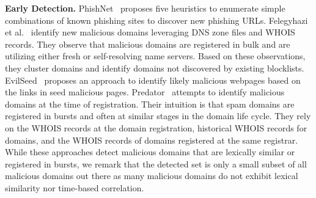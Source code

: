 {\bf Early Detection.} PhishNet~\cite{phishnet:2010} proposes five
heuristics to enumerate simple combinations of known phishing sites to discover new phishing URLs. Felegyhazi et al.~\cite{predictive:leet:2010} identify new malicious domains leveraging DNS zone files and WHOIS records. They observe that malicious domains are registered in bulk and are utilizing either fresh or self-resolving name servers. Based on these observations, they cluster domains and identify domains not discovered by existing blocklists. EvilSeed~\cite{evilseed:sp:2012} proposes an approach to identify likely malicious webpages based on the links in seed malicious pages.  Predator~\cite{Predator_Hao2016} attempts to identify malicious domains at the time of registration. Their intuition is that spam domains are registered in bursts and often at similar stages in the domain life cycle. They rely on the WHOIS records at the domain registration, historical WHOIS records for domains, and the WHOIS records of domains registered at the same registrar. While these approaches detect malicious domains that are lexically similar or registered in bursts, we remark that the detected set is only a small subset of all malicious domains out there as many malicious domains do not exhibit lexical similarity nor time-based correlation. 


